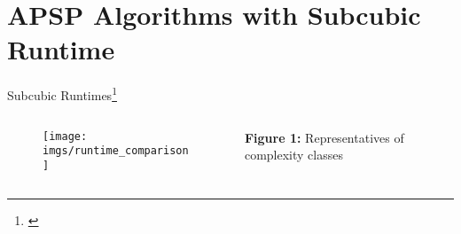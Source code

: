 \section{APSP Algorithms with Subcubic Runtime}

\begin{frame}{Subcubic Runtimes\footnote[1]{\cite[Section~1]{Chan2007}}}
    \begin{columns}
        \begin{column}{.65\linewidth}
            \begin{figure}
                \texttt{[image: imgs/runtime\_comparison]}
            \end{figure}
        \end{column}
        \begin{column}{.35\linewidth}
            \textbf{Figure 1:} Representatives of complexity classes
        \end{column}
    \end{columns}
\end{frame}

